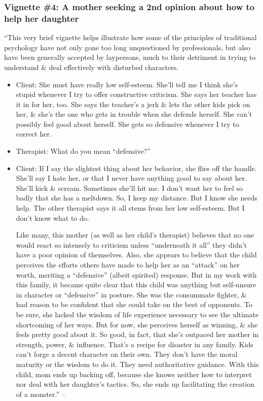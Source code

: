 \documentclass{article}
\numberwithin{equation}{section}
\begin{document}
\subsubsection{Vignette \#4: A mother seeking a 2nd opinion about how to help her daughter}
``This very brief vignette helps illustrate how some of the principles of traditional psychology have not only gone too long unquestioned by professionals, but also have been generally accepted by laypersons, much to their detriment in trying to understand \& deal effectively with disturbed characters.
\begin{itemize}
	\item Client: She must have really low self-esteem. She'll tell me I think she's stupid whenever I try to offer constructive criticism. She says her teacher has it in for her, too. She says the teacher's a jerk \& lets the other kids pick on her, \& she's the one who gets in trouble when she defends herself. She can't possibly feel good about herself. She gets so defensive whenever I try to correct her.
	\item Therapist: What do you mean ``defensive?''
	\item Client: If I say the slightest thing about her behavior, she flies off the handle. She'll say I hate her, or that I never have anything good to say about her. She'll kick \& scream. Sometimes she'll hit me. I don't want her to feel so badly that she has a meltdown. So, I keep my distance. But I know she needs help. The other therapist says it all stems from her low self-esteem. But I don't know what to do.
	
	Like many, this mother (as well as her child's therapist) believes that no one would react so intensely to criticism unless ``underneath it all'' they didn't have a poor opinion of themselves. Also, she appears to believe that the child perceives the efforts others have made to help her as an ``attack'' on her worth, meriting a ``defensive'' (albeit spirited) response. But in my work with this family, it became quite clear that this child was anything but self-unsure in character or ``defensive'' in posture. She was the consummate fighter, \& had reason to be confident that she could take on the best of opponents. To be sure, she lacked the wisdom of life experience necessary to see the ultimate shortcoming of her ways. But for now, she perceives herself as winning, \& she feels pretty good about it. So good, in fact, that she's outpaced her mother in strength, power, \& influence. That's a recipe for disaster in any family. Kids can't forge a decent character on their own. They don't have the moral maturity or the wisdom to do it. They need authoritative guidance. With this child, mom ends up backing off, because she knows neither how to interpret nor deal with her daughter's tactics. So, she ends up facilitating the creation of a monster.'' -- \cite[pp. 231--232]{Simon2011}
\end{itemize}
\end{document}
